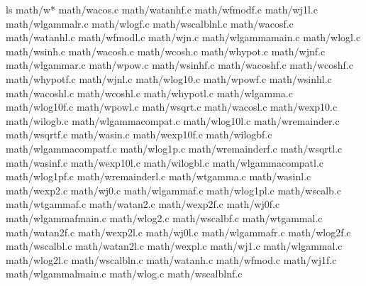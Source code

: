 \documentclass[letterpaper,10pt,english]{sphinxmanual}
\begin{document}
\begin{sphinxVerbatim}[commandchars=\\\{\}]
\PYGZdl{} ls math/w\PYGZus{}*
math/w\PYGZus{}acos.c    math/w\PYGZus{}atanhf.c  math/w\PYGZus{}fmodf.c   math/w\PYGZus{}j1l.c             math/w\PYGZus{}lgammal\PYGZus{}r.c    math/w\PYGZus{}logf.c        math/w\PYGZus{}scalblnl.c
math/w\PYGZus{}acosf.c   math/w\PYGZus{}atanhl.c  math/w\PYGZus{}fmodl.c   math/w\PYGZus{}jn.c              math/w\PYGZus{}lgamma\PYGZus{}main.c  math/w\PYGZus{}logl.c        math/w\PYGZus{}sinh.c
math/w\PYGZus{}acosh.c   math/w\PYGZus{}cosh.c    math/w\PYGZus{}hypot.c   math/w\PYGZus{}jnf.c             math/w\PYGZus{}lgamma\PYGZus{}r.c     math/w\PYGZus{}pow.c         math/w\PYGZus{}sinhf.c
math/w\PYGZus{}acoshf.c  math/w\PYGZus{}coshf.c   math/w\PYGZus{}hypotf.c  math/w\PYGZus{}jnl.c             math/w\PYGZus{}log10.c        math/w\PYGZus{}powf.c        math/w\PYGZus{}sinhl.c
math/w\PYGZus{}acoshl.c  math/w\PYGZus{}coshl.c   math/w\PYGZus{}hypotl.c  math/w\PYGZus{}lgamma.c          math/w\PYGZus{}log10f.c       math/w\PYGZus{}powl.c        math/w\PYGZus{}sqrt.c
math/w\PYGZus{}acosl.c   math/w\PYGZus{}exp10.c   math/w\PYGZus{}ilogb.c   math/w\PYGZus{}lgamma\PYGZus{}compat.c   math/w\PYGZus{}log10l.c       math/w\PYGZus{}remainder.c   math/w\PYGZus{}sqrtf.c
math/w\PYGZus{}asin.c    math/w\PYGZus{}exp10f.c  math/w\PYGZus{}ilogbf.c  math/w\PYGZus{}lgamma\PYGZus{}compatf.c  math/w\PYGZus{}log1p.c        math/w\PYGZus{}remainderf.c  math/w\PYGZus{}sqrtl.c
math/w\PYGZus{}asinf.c   math/w\PYGZus{}exp10l.c  math/w\PYGZus{}ilogbl.c  math/w\PYGZus{}lgamma\PYGZus{}compatl.c  math/w\PYGZus{}log1pf.c       math/w\PYGZus{}remainderl.c  math/w\PYGZus{}tgamma.c
math/w\PYGZus{}asinl.c   math/w\PYGZus{}exp2.c    math/w\PYGZus{}j0.c      math/w\PYGZus{}lgammaf.c         math/w\PYGZus{}log1pl.c       math/w\PYGZus{}scalb.c       math/w\PYGZus{}tgammaf.c
math/w\PYGZus{}atan2.c   math/w\PYGZus{}exp2f.c   math/w\PYGZus{}j0f.c     math/w\PYGZus{}lgammaf\PYGZus{}main.c    math/w\PYGZus{}log2.c         math/w\PYGZus{}scalbf.c      math/w\PYGZus{}tgammal.c
math/w\PYGZus{}atan2f.c  math/w\PYGZus{}exp2l.c   math/w\PYGZus{}j0l.c     math/w\PYGZus{}lgammaf\PYGZus{}r.c       math/w\PYGZus{}log2f.c        math/w\PYGZus{}scalbl.c
math/w\PYGZus{}atan2l.c  math/w\PYGZus{}expl.c    math/w\PYGZus{}j1.c      math/w\PYGZus{}lgammal.c         math/w\PYGZus{}log2l.c        math/w\PYGZus{}scalbln.c
math/w\PYGZus{}atanh.c   math/w\PYGZus{}fmod.c    math/w\PYGZus{}j1f.c     math/w\PYGZus{}lgammal\PYGZus{}main.c    math/w\PYGZus{}log.c          math/w\PYGZus{}scalblnf.c
\end{sphinxVerbatim}
\end{document}
